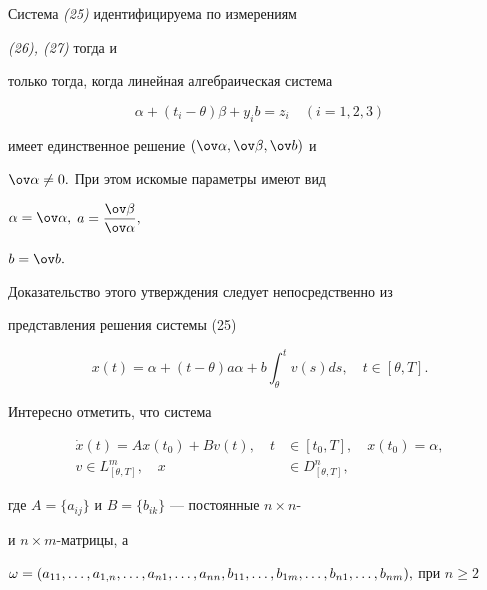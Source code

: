 \begin{assrt} Система {\em (25)} идентифицируема по измерениям


{\em (26), (27)} тогда и


только тогда, когда линейная алгебраическая система


$$


\alpha + (t_i-\theta)\beta + y_i b = z_i\quad (i = 1, 2, 3)


$$


имеет единственное решение $(\ov\alpha, \ov\beta,\ov b)$ и


$\ov\alpha\ne 0.$ При этом искомые параметры имеют вид


$\alpha=\ov\alpha,$ ${\displaystyle a=\frac{\ov\beta}{\ov\alpha},}$


$b=\ov b.$


\end{assrt}





Доказательство этого утверждения следует непосредственно из


представления решения системы (25)


$$


x(t) = \alpha + (t-\theta) a \alpha + b\int_{\theta}^t v(s)ds,\quad


t\in[\theta,T].


$$





Интересно отметить, что система


\begin{equation}


\begin{split}


\Dot{x}(t) = A x(t_0) + B v(t),\quad t&\in[t_0,T],\quad x(t_0)=\alpha,\\


v\in L^m_{[\theta,T]},\quad x&\in D^n_{[\theta,T]},


\end{split}


\end{equation}


где $A=\{a_{ij}\}$ и $B=\{b_{ik}\}$ --- постоянные $n\times n$-


и $n\times m$-матрицы, а


$\omega=(a_{11}, \dotsc, a_{1,n}, \dotsc, a_{n1}, \dotsc, a_{nn},\linebreak


b_{11}, \dotsc, b_{1m}, \dotsc, b_{n1}, \dotsc, b_{nm}),$ при $n\ge 2$


